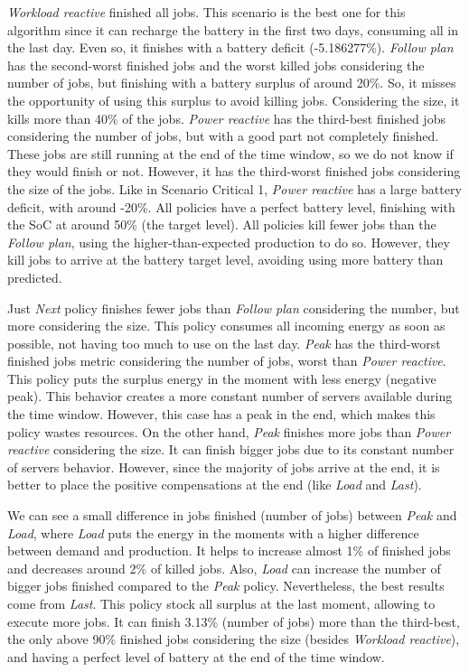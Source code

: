 \emph{Workload reactive} finished all jobs. This scenario is the best one for this algorithm since it can recharge the battery in the first two days, consuming all in the last day. Even so, it finishes with a battery deficit (-5.186277\%). \emph{Follow plan} has the second-worst finished jobs and the worst killed jobs considering the number of jobs, but finishing with a battery surplus of around 20\%. So, it misses the opportunity of using this surplus to avoid killing jobs. Considering the size, it kills more than 40\% of the jobs. \emph{Power reactive} has the third-best finished jobs considering the number of jobs, but with a good part not completely finished. These jobs are still running at the end of the time window, so we do not know if they would finish or not. However, it has the third-worst finished jobs considering the size of the jobs. Like in Scenario Critical 1, \emph{Power reactive} has a large battery deficit, with around -20\%. All policies have a perfect battery level, finishing with the SoC at around 50\% (the target level). All policies kill fewer jobs than the \emph{Follow plan}, using the higher-than-expected production to do so. However, they kill jobs to arrive at the battery target level, avoiding using more battery than predicted.

Just \emph{Next} policy finishes fewer jobs than \emph{Follow plan} considering the number, but more considering the size. This policy consumes all incoming energy as soon as possible, not having too much to use on the last day. \emph{Peak} has the third-worst finished jobs metric considering the number of jobs, worst than \emph{Power reactive}. This policy puts the surplus energy in the moment with less energy (negative peak). This behavior creates a more constant number of servers available during the time window. However, this case has a peak in the end, which makes this policy wastes resources. On the other hand, \emph{Peak} finishes more jobs than \emph{Power reactive} considering the size. It can finish bigger jobs due to its constant number of servers behavior. However, since the majority of jobs arrive at the end, it is better to place the positive compensations at the end (like \emph{Load} and \emph{Last}).

We can see a small difference in jobs finished (number of jobs) between \emph{Peak} and \emph{Load}, where \emph{Load} puts the energy in the moments with a higher difference between demand and production. It helps to increase almost 1\% of finished jobs and decreases around 2\% of killed jobs. Also, \emph{Load} can increase the number of bigger jobs finished compared to the \emph{Peak} policy. Nevertheless, the best results come from \emph{Last}. This policy stock all surplus at the last moment, allowing to execute more jobs. It can finish 3.13\% (number of jobs) more than the third-best, the only above 90\% finished jobs considering the size (besides \emph{Workload reactive}), and having a perfect level of battery at the end of the time window.

